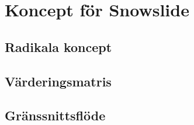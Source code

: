 \documentclass[a4paper,12pt,titlepage]{article}
\begin{document}
\section*{Koncept för Snowslide}
\subsection*{Radikala koncept}

\subsection*{Värderingsmatris}

\subsection*{Gränssnittsflöde}
\end{document}
